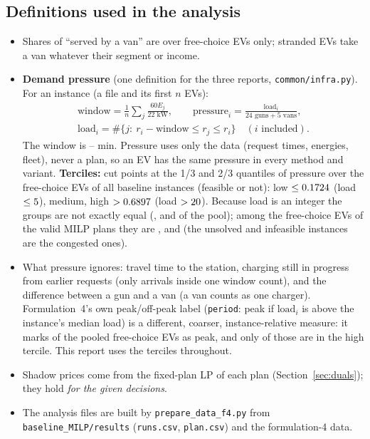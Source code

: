 \subsection{Definitions used in the analysis}
\label{sec:defs}
\begin{itemize}
  \item Shares of ``served by a van'' are over free-choice EVs only; stranded EVs take a van whatever their segment or income.
  \item \textbf{Demand pressure} (one definition for the three reports, \texttt{common/infra.py}). For an instance (a file and its first $n$ EVs):
  \begin{gather*}
  \text{window}=\frac1n\sum_{j}\frac{60E_j}{22\text{ kW}},\qquad
  \text{pressure}_i=\frac{\text{load}_i}{24\text{ guns}+5\text{ vans}},\\
  \text{load}_i=\#\{j:\ r_i-\text{window}\le r_j\le r_i\}\quad(i\text{ included}).
  \end{gather*}
  The window is \TauBarMin--\TauBarMax{} min. Pressure uses only the data (request times, energies, fleet), never a plan, so an EV has the same pressure in every method and variant. \textbf{Terciles:} cut points at the 1/3 and 2/3 quantiles of pressure over the \NPressPool{} free-choice EVs of all \NPressPoolInst{} baseline instances (feasible or not): low $\le0.1724$ (load $\le5$), medium, high $>0.6897$ (load $>20$). Because load is an integer the groups are not exactly equal (\PoolShareLow, \PoolShareMedium{} and \PoolShareHigh\pct{} of the pool); among the free-choice EVs of the valid MILP plans they are \MilpShareLow, \MilpShareMedium{} and \MilpShareHigh\pct{} (the unsolved and infeasible instances are the congested ones).
  \item What pressure ignores: travel time to the station, charging still in progress from earlier requests (only arrivals inside one window count), and the difference between a gun and a van (a van counts as one charger). Formulation~4's own peak/off-peak label (\texttt{period}: peak if $\text{load}_i$ is above the instance's median load) is a different, coarser, instance-relative measure: it marks \PeakLabelShare\pct{} of the pooled free-choice EVs as peak, and only \PeakLabelHighShare\pct{} of those are in the high tercile. This report uses the terciles throughout.
  \item Shadow prices come from the fixed-plan LP of each plan (Section~\ref{sec:duals}); they hold \emph{for the given decisions}.
  \item The analysis files are built by \texttt{prepare\_data\_f4.py} from \texttt{baseline\_MILP/results} (\texttt{runs.csv}, \texttt{plan.csv}) and the formulation-4 data.
\end{itemize}

